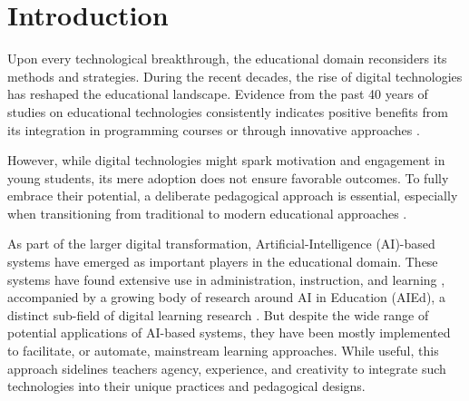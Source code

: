 \documentclass[sn-mathphys, Numbered]{sn-jnl}%
\theoremstyle{thmstyleone}%
\theoremstyle{thmstyletwo}%
\theoremstyle{thmstylethree}%
\begin{document}




\maketitle

\section{Introduction}

Upon every technological breakthrough, the educational domain reconsiders its methods and strategies. During the recent decades, the rise of digital technologies has reshaped the educational landscape. Evidence from the past 40 years of studies on educational technologies consistently indicates positive benefits from its integration in programming courses or through innovative approaches \parencite{higgins_impact_2012}.  

However, while digital technologies might spark motivation and engagement in young students, its mere adoption does not ensure favorable outcomes.  To fully embrace their potential, a deliberate pedagogical approach is essential, especially when transitioning from traditional to modern educational approaches \parencite{parker_authentic_2020,khaddage_bridging_2021} . 

As part of the larger digital transformation, Artificial-Intelligence (AI)-based systems have emerged as important players in the educational domain. These systems have found extensive use in administration, instruction, and learning \parencite{chen_application_2020}, accompanied by a growing body of research around AI in Education (AIEd), a distinct sub-field of digital learning research \parencite{niemi_ai_2023}.  But despite the wide range of potential applications of AI-based systems, they have been mostly implemented to facilitate, or automate, mainstream learning approaches. While useful, this approach sidelines teachers agency, experience, and creativity to integrate such technologies into their unique practices and pedagogical designs. \parencite{holmes_artificial_2023}
\end{document}

